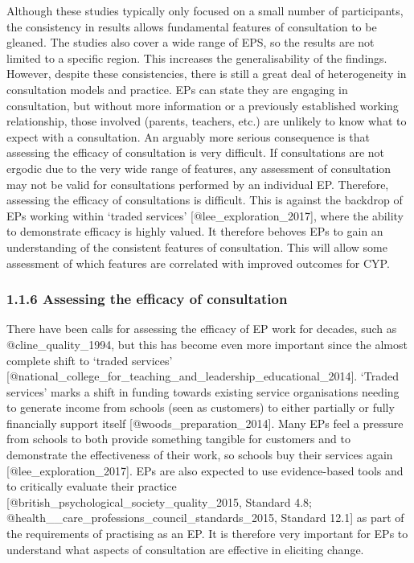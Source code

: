 \documentclass[
]{article}
\begin{document}
Although these studies typically only focused on a small number of
participants, the consistency in results allows fundamental features of
consultation to be gleaned. The studies also cover a wide range of EPS,
so the results are not limited to a specific region. This increases the
generalisability of the findings. However, despite these consistencies,
there is still a great deal of heterogeneity in consultation models and
practice. EPs can state they are engaging in consultation, but without
more information or a previously established working relationship, those
involved (parents, teachers, etc.) are unlikely to know what to expect
with a consultation. An arguably more serious consequence is that
assessing the efficacy of consultation is very difficult. If
consultations are not ergodic due to the very wide range of features,
any assessment of consultation may not be valid for consultations
performed by an individual EP. Therefore, assessing the efficacy of
consultations is difficult. This is against the backdrop of EPs working
within `traded services' {[}@lee\_exploration\_2017{]}, where the
ability to demonstrate efficacy is highly valued. It therefore behoves
EPs to gain an understanding of the consistent features of consultation.
This will allow some assessment of which features are correlated with
improved outcomes for CYP.

\hypertarget{assessing-the-efficacy-of-consultation}{%
\subsubsection{1.1.6 Assessing the efficacy of
consultation}\label{assessing-the-efficacy-of-consultation}}

There have been calls for assessing the efficacy of EP work for decades,
such as @cline\_quality\_1994, but this has become even more important
since the almost complete shift to `traded services'
{[}@national\_college\_for\_teaching\_and\_leadership\_educational\_2014{]}.
`Traded services' marks a shift in funding towards existing service
organisations needing to generate income from schools (seen as
customers) to either partially or fully financially support itself
{[}@woods\_preparation\_2014{]}. Many EPs feel a pressure from schools
to both provide something tangible for customers and to demonstrate the
effectiveness of their work, so schools buy their services again
{[}@lee\_exploration\_2017{]}. EPs are also expected to use
evidence-based tools and to critically evaluate their practice
{[}@british\_psychological\_society\_quality\_2015, Standard 4.8;
@health\_\_care\_professions\_council\_standards\_2015, Standard 12.1{]}
as part of the requirements of practising as an EP. It is therefore very
important for EPs to understand what aspects of consultation are
effective in eliciting change.
\end{document}
